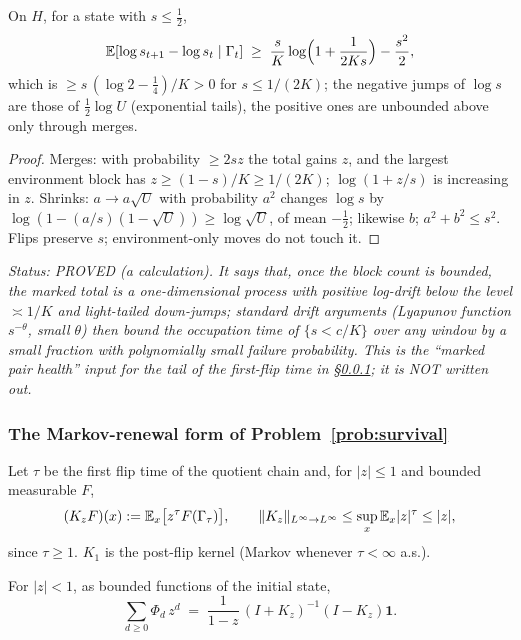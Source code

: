 \begin{lemma}\label{lem:logdrift}
On $H$, for a state with $s\le\tfrac12$,
\[
\mathbb{E}[\log s_{t+1}-\log s_t\mid\Gamma_t]\;\ge\;\frac{s}{K}\log\Bigl(1+\frac1{2Ks}\Bigr)-\frac{s^2}2 ,
\]
which is $\ge s\,(\log2-\tfrac14)/K>0$ for $s\le1/(2K)$; the negative
jumps of $\log s$ are those of $\tfrac12\log U$ (exponential tails),
the positive ones are unbounded above only through merges.
\end{lemma}

\begin{proof}
Merges: with probability $\ge2sz$ the total gains $z$, and the largest
environment block has $z\ge(1-s)/K\ge1/(2K)$; $\log(1+z/s)$ is
increasing in $z$.  Shrinks: $a\to a\sqrt U$ with probability $a^2$
changes $\log s$ by $\log(1-(a/s)(1-\sqrt U))\ge\log\sqrt U$, of mean
$-\tfrac12$; likewise $b$; $a^2+b^2\le s^2$.  Flips preserve $s$;
environment-only moves do not touch it.
\end{proof}

\emph{Status: PROVED (a calculation).  It says that, once the block
count is bounded, the marked total is a one-dimensional process with
positive log-drift below the level $\asymp1/K$ and light-tailed
down-jumps; standard drift arguments (Lyapunov function
$s^{-\theta}$, small $\theta$) then bound the occupation time of
$\{s<c/K\}$ over any window by a small fraction with polynomially
small failure probability.  This is the ``marked pair health''
input for the tail of the first-flip time in
\S\ref{sec:markovrenewal}; it is NOT written out.}

\subsubsection{The Markov-renewal form of Problem~\ref{prob:survival}}
\label{sec:markovrenewal}

Let $\tau$ be the first flip time of the quotient chain and, for
$|z|\le1$ and bounded measurable $F$,
\[
(K_zF)(x):=\mathbb{E}_x\bigl[z^{\tau}F(\Gamma_\tau)\bigr],
\qquad \|K_z\|_{L^\infty\to L^\infty}\le\sup_x\mathbb{E}_x|z|^{\tau}\le|z| ,
\]
since $\tau\ge1$.  $K_1$ is the post-flip kernel (Markov whenever
$\tau<\infty$ a.s.).

\begin{proposition}\label{prop:genfun}
For $|z|<1$, as bounded functions of the initial state,
\[
\sum_{d\ge0}\Phi_d\,z^d\;=\;\frac1{1-z}\,(I+K_z)^{-1}(I-K_z)\mathbf 1 .
\]
\end{proposition}

